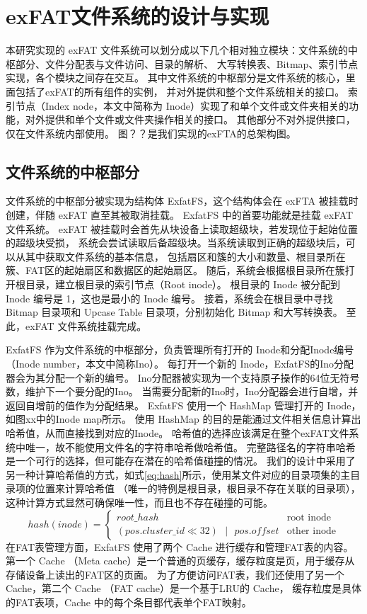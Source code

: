 
\chapter{exFAT文件系统的设计与实现}
本研究实现的 exFAT 文件系统可以划分成以下几个相对独立模块：文件系统的中枢部分、文件分配表与文件访问、目录的解析、
大写转换表、Bitmap、索引节点实现，各个模块之间存在交互。
其中文件系统的中枢部分是文件系统的核心，里面包括了exFAT的所有组件的实例，
并对外提供和整个文件系统相关的接口。
索引节点（Index node，本文中简称为 Inode）实现了和单个文件或文件夹相关的功能，对外提供和单个文件或文件夹操作相关的接口。
其他部分不对外提供接口，仅在文件系统内部使用。
图？？是我们实现的exFTA的总架构图。

\section{文件系统的中枢部分}
文件系统的中枢部分被实现为结构体 ExfatFS，这个结构体会在 exFTA 被挂载时创建，伴随 exFAT 直至其被取消挂载。
ExfatFS 中的首要功能就是挂载 exFAT 文件系统。
exFAT 被挂载时会首先从块设备上读取超级块，若发现位于起始位置的超级块受损，
系统会尝试读取后备超级块。当系统读取到正确的超级块后，可以从其中获取文件系统的基本信息，
包括扇区和簇的大小和数量、根目录所在簇、FAT区的起始扇区和数据区的起始扇区。
随后，系统会根据根目录所在簇打开根目录，建立根目录的索引节点（Root inode）。
根目录的 Inode 被分配到 Inode 编号是 1，这也是最小的 Inode 编号。
接着，系统会在根目录中寻找 Bitmap 目录项和 Upcase Table 目录项，分别初始化 Bitmap 和大写转换表。
至此，exFAT 文件系统挂载完成。

ExfatFS 作为文件系统的中枢部分，负责管理所有打开的 Inode和分配Inode编号（Inode number，本文中简称Ino）。
每打开一个新的 Inode，ExfatFS的Ino分配器会为其分配一个新的编号。
Ino分配器被实现为一个支持原子操作的64位无符号数，维护下一个要分配的Ino。
当需要分配新的Ino时，Ino分配器会进行自增，并返回自增前的值作为分配结果。
ExfatFS 使用一个 HashMap 管理打开的 Inode，如图xx中的Inode map所示。
使用 HashMap 的目的是能通过文件相关信息计算出哈希值，从而直接找到对应的Inode。
哈希值的选择应该满足在整个exFAT文件系统中唯一，故不能使用文件名的字符串哈希做哈希值。
完整路径名的字符串哈希是一个可行的选择，但可能存在潜在的哈希值碰撞的情况。
我们的设计中采用了另一种计算哈希值的方式，如式\ref{eq:hash}所示，使用某文件对应的目录项集的主目录项的位置来计算哈希值
（唯一的特例是根目录，根目录不存在关联的目录项），这种计算方式显然可确保唯一性，而且也不存在碰撞的可能。
\begin{equation}\label{eq:hash}
    hash(inode) = 
    \begin{cases}
        root\_hash & \text{root inode} \\
        (pos.cluster\_id \ll 32) \text{ }|\text{ } pos.offset & \text{other inode}
    \end{cases}
\end{equation}
在FAT表管理方面，ExfatFS 使用了两个 Cache 进行缓存和管理FAT表的内容。
第一个 Cache （Meta cache）是一个普通的页缓存，缓存粒度是页，用于缓存从存储设备上读出的FAT区的页面。
为了方便访问FAT表，我们还使用了另一个 Cache，第二个 Cache （FAT cache）是一个基于LRU的 Cache，
缓存粒度是具体的FAT表项，Cache 中的每个条目都代表单个FAT映射。

